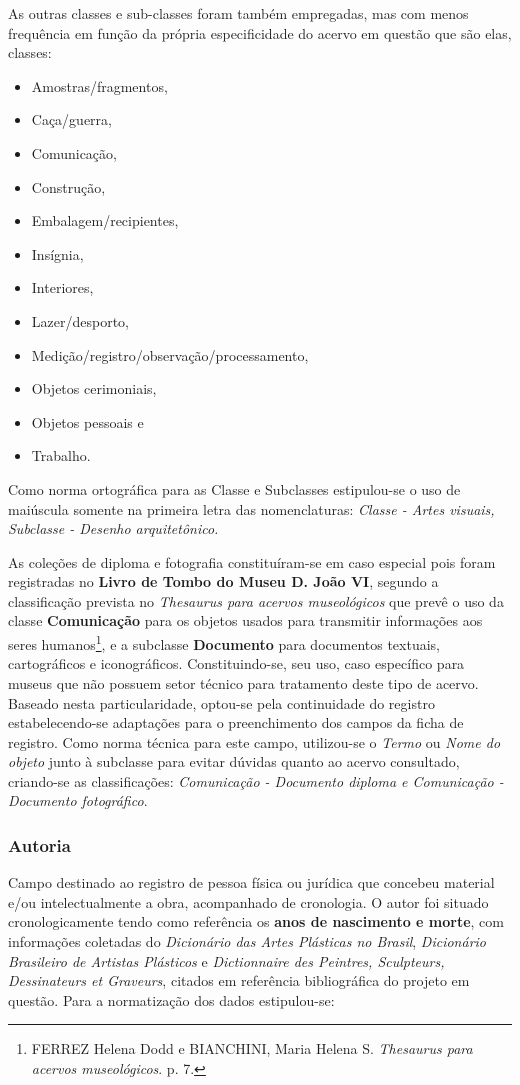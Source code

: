 As outras classes e sub-classes foram também empregadas, mas com menos frequência em função da própria especificidade do acervo em questão que são elas, classes: 
\begin{itemize}
	\item Amostras/fragmentos, 
	\item Caça/guerra, 
	\item Comunicação, 
	\item Construção, 
	\item Embalagem/recipientes, 
	\item Insígnia, 
	\item Interiores, 
	\item Lazer/desporto,
	\item Medição/registro/observação/processamento, 
	\item Objetos cerimoniais, 
	\item Objetos pessoais e 
	\item Trabalho.
\end{itemize} 

Como norma ortográfica para as Classe e Subclasses
estipulou-se o uso de maiúscula somente na primeira letra das nomenclaturas: \textit{Classe - Artes visuais, Subclasse - Desenho arquitetônico.}

As coleções de diploma e fotografia constituíram-se em caso especial pois foram registradas no \textbf{Livro de Tombo do Museu D. João VI}, segundo a classificação prevista no \textit{Thesaurus para acervos museológicos} que prevê o uso da classe \textbf{Comunicação} para os objetos usados para transmitir informações aos seres humanos\footnote{FERREZ Helena Dodd e BIANCHINI, Maria Helena S. \textit{Thesaurus para acervos museológicos}. p. 7.}, e a subclasse \textbf{Documento} para documentos textuais, cartográficos e iconográficos. Constituindo-se, seu uso, caso específico para museus que não possuem setor técnico para tratamento deste tipo de acervo. Baseado nesta particularidade, optou-se pela continuidade do registro estabelecendo-se adaptações para o preenchimento dos campos da ficha de registro. Como norma técnica para este campo, utilizou-se o \textit{Termo} ou \textit{Nome do objeto} junto à subclasse para evitar dúvidas quanto ao acervo consultado, criando-se as classificações: \textit{Comunicação - Documento diploma e Comunicação - Documento fotográfico}.


\subsubsection{Autoria}
Campo destinado ao registro de pessoa física ou jurídica que concebeu material e/ou intelectualmente a obra, acompanhado de cronologia. O autor foi situado cronologicamente tendo como referência os \textbf{anos de nascimento e morte}, com informações coletadas do \textit{Dicionário das Artes Plásticas no Brasil}, \textit{Dicionário Brasileiro de Artistas Plásticos} e \textit{Dictionnaire des Peintres, Sculpteurs, Dessinateurs et Graveurs}, citados em referência bibliográfica do projeto em questão. Para a normatização dos dados estipulou-se:


